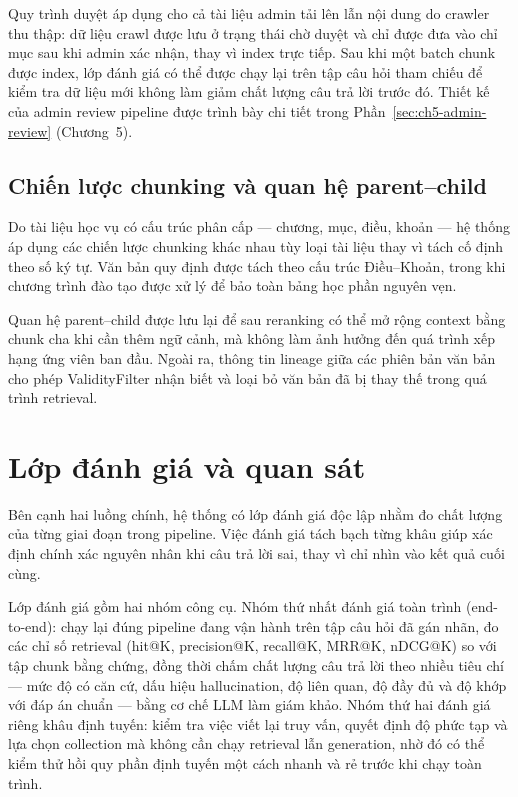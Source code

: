 \documentclass[../DoAn.tex]{subfiles}
\begin{document}
Quy trình duyệt áp dụng cho cả tài liệu admin tải lên lẫn nội dung do crawler
thu thập: dữ liệu crawl được lưu ở trạng thái chờ duyệt và chỉ được đưa vào chỉ
mục sau khi admin xác nhận, thay vì index trực tiếp. Sau khi một batch chunk
được index, lớp đánh giá có thể được chạy lại trên tập câu hỏi tham chiếu để
kiểm tra dữ liệu mới không làm giảm chất lượng câu trả lời trước đó. Thiết kế
của admin review pipeline được trình bày chi tiết trong
Phần~\ref{sec:ch5-admin-review} (Chương~5).

\subsection{Chiến lược chunking và quan hệ parent--child}

Do tài liệu học vụ có cấu trúc phân cấp --- chương, mục, điều, khoản --- hệ
thống áp dụng các chiến lược chunking khác nhau tùy loại tài liệu thay vì tách
cố định theo số ký tự. Văn bản quy định được tách theo cấu trúc Điều--Khoản,
trong khi chương trình đào tạo được xử lý để bảo toàn bảng học phần nguyên vẹn.

Quan hệ parent--child được lưu lại để sau reranking có thể mở rộng context bằng
chunk cha khi cần thêm ngữ cảnh, mà không làm ảnh hưởng đến quá trình xếp hạng
ứng viên ban đầu. Ngoài ra, thông tin lineage giữa các phiên bản văn bản cho
phép ValidityFilter nhận biết và loại bỏ văn bản đã bị thay thế trong quá trình
retrieval.

\section{Lớp đánh giá và quan sát}

Bên cạnh hai luồng chính, hệ thống có lớp đánh giá độc lập nhằm đo chất lượng
của từng giai đoạn trong pipeline. Việc đánh giá tách bạch từng khâu giúp xác
định chính xác nguyên nhân khi câu trả lời sai, thay vì chỉ nhìn vào kết quả
cuối cùng.

Lớp đánh giá gồm hai nhóm công cụ. Nhóm thứ nhất đánh giá toàn trình
(end-to-end): chạy lại đúng pipeline đang vận hành trên tập câu hỏi đã gán nhãn,
đo các chỉ số retrieval (hit@K, precision@K, recall@K, MRR@K, nDCG@K) so với
tập chunk bằng chứng, đồng thời chấm chất lượng câu trả lời theo nhiều tiêu chí
--- mức độ có căn cứ, dấu hiệu hallucination, độ liên quan, độ đầy đủ và độ khớp
với đáp án chuẩn --- bằng cơ chế LLM làm giám khảo. Nhóm thứ hai đánh giá riêng
khâu định tuyến: kiểm tra việc viết lại truy vấn, quyết định độ phức tạp và lựa
chọn collection mà không cần chạy retrieval lẫn generation, nhờ đó có thể kiểm
thử hồi quy phần định tuyến một cách nhanh và rẻ trước khi chạy toàn trình.
\end{document}
